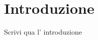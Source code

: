 \chapter{Introduzione}
\pagestyle{fancy}
\fancyhf{}
\renewcommand{\headrulewidth}{2pt}
\fancyhead[EL]{\textbf{\textsf{\nouppercase\thepage}}}
\fancyhead[ER]{\textbf{\textsf{\nouppercase\leftmark}}}
\fancyhead[OR]{\textbf{\textsf{\nouppercase\thepage}}}
\fancyhead[OL]{\textbf{\textsf{\nouppercase {\rightmark}}}}

\thispagestyle{empty}

Scrivi qua l' introduzione